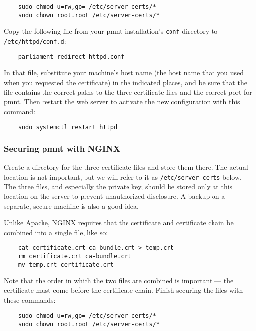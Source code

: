 \begin{Verbatim}
	sudo chmod u=rw,go= /etc/server-certs/*
	sudo chown root.root /etc/server-certs/*
\end{Verbatim}

Copy the following file from your \ac{pmnt} installation's \texttt{conf} directory to \texttt{/etc/httpd/conf.d}:

\begin{Verbatim}
	parliament-redirect-httpd.conf
\end{Verbatim}

In that file, substitute your machine's host name (the host name that you used when you requested the certificate) in the indicated places, and be sure that the file contains the correct paths to the three certificate files and the correct port for \ac{pmnt}.  Then restart the web server to activate the new configuration with this command:

\begin{Verbatim}
	sudo systemctl restart httpd
\end{Verbatim}



\subsubsection{Securing \ac{pmnt} with NGINX}
\label{section-securing-parliament-nginx}

Create a directory for the three certificate files and store them there.  The actual location is not important, but we will refer to it as \texttt{/etc/server-certs} below.  The three files, and especially the private key, should be stored only at this location on the server to prevent unauthorized disclosure.  A backup on a separate, secure machine is also a good idea.

Unlike Apache, NGINX requires that the certificate and certificate chain be combined into a single file, like so:

\begin{Verbatim}
	cat certificate.crt ca-bundle.crt > temp.crt
	rm certificate.crt ca-bundle.crt
	mv temp.crt certificate.crt
\end{Verbatim}

Note that the order in which the two files are combined is important --- the certificate must come before the certificate chain.  Finish securing the files with these commands:

\begin{Verbatim}
	sudo chmod u=rw,go= /etc/server-certs/*
	sudo chown root.root /etc/server-certs/*
\end{Verbatim}

